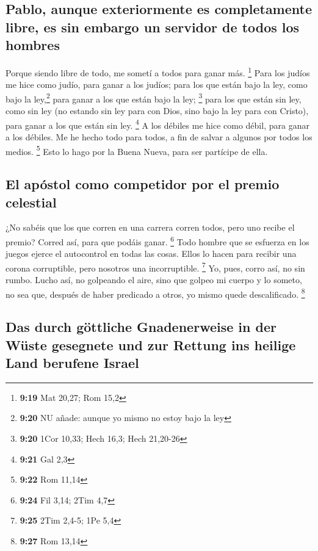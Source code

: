 \hypertarget{pablo-aunque-exteriormente-es-completamente-libre-es-sin-embargo-un-servidor-de-todos-los-hombres}{%
\subsection{Pablo, aunque exteriormente es completamente libre, es sin
embargo un servidor de todos los
hombres}\label{pablo-aunque-exteriormente-es-completamente-libre-es-sin-embargo-un-servidor-de-todos-los-hombres}}

 Porque siendo libre de todo, me sometí a todos para
ganar más. \footnote{\textbf{9:19} Mat 20,27; Rom 15,2} 
Para los judíos me hice como judío, para ganar a los judíos; para los
que están bajo la ley, como bajo la ley,\footnote{\textbf{9:20} NU
  añade: aunque yo mismo no estoy bajo la ley} para ganar a los que
están bajo la ley; \footnote{\textbf{9:20} 1Cor 10,33; Hech 16,3; Hech
  21,20-26}  para los que están sin ley, como sin ley (no
estando sin ley para con Dios, sino bajo la ley para con Cristo), para
ganar a los que están sin ley. \footnote{\textbf{9:21} Gal 2,3}
 A los débiles me hice como débil, para ganar a los
débiles. Me he hecho todo para todos, a fin de salvar a algunos por
todos los medios. \footnote{\textbf{9:22} Rom 11,14} 
Esto lo hago por la Buena Nueva, para ser partícipe de ella.

\hypertarget{el-apuxf3stol-como-competidor-por-el-premio-celestial}{%
\subsection{El apóstol como competidor por el premio
celestial}\label{el-apuxf3stol-como-competidor-por-el-premio-celestial}}

 ¿No sabéis que los que corren en una carrera corren
todos, pero uno recibe el premio? Corred así, para que podáis ganar.
\footnote{\textbf{9:24} Fil 3,14; 2Tim 4,7}  Todo hombre
que se esfuerza en los juegos ejerce el autocontrol en todas las cosas.
Ellos lo hacen para recibir una corona corruptible, pero nosotros una
incorruptible. \footnote{\textbf{9:25} 2Tim 2,4-5; 1Pe 5,4}
 Yo, pues, corro así, no sin rumbo. Lucho así, no
golpeando el aire,  sino que golpeo mi cuerpo y lo
someto, no sea que, después de haber predicado a otros, yo mismo quede
descalificado. \footnote{\textbf{9:27} Rom 13,14}

\hypertarget{das-durch-guxf6ttliche-gnadenerweise-in-der-wuxfcste-gesegnete-und-zur-rettung-ins-heilige-land-berufene-israel}{%
\subsection{Das durch göttliche Gnadenerweise in der Wüste gesegnete und
zur Rettung ins heilige Land berufene
Israel}\label{das-durch-guxf6ttliche-gnadenerweise-in-der-wuxfcste-gesegnete-und-zur-rettung-ins-heilige-land-berufene-israel}}

